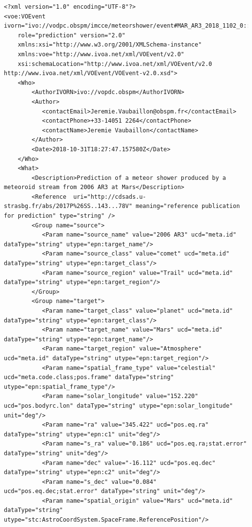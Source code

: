 \documentclass[referee,a4paper,12pt,traditabstract]{swsc}
\begin{document}
\begin{linenumbers}
{\tiny 
\begin{verbatim}
<?xml version="1.0" encoding="UTF-8"?>
<voe:VOEvent ivorn="ivo://vodpc.obspm/imcce/meteorshower/event#MAR_AR3_2018_1102_0::v1.0"
    role="prediction" version="2.0"
    xmlns:xsi="http://www.w3.org/2001/XMLSchema-instance"
    xmlns:voe="http://www.ivoa.net/xml/VOEvent/v2.0"
    xsi:schemaLocation="http://www.ivoa.net/xml/VOEvent/v2.0 http://www.ivoa.net/xml/VOEvent/VOEvent-v2.0.xsd">
    <Who>
        <AuthorIVORN>ivo://vopdc.obspm</AuthorIVORN>
        <Author>
           <contactEmail>Jeremie.Vaubaillon@obspm.fr</contactEmail>
           <contactPhone>+33-14051 2264</contactPhone>
           <contactName>Jeremie Vaubaillon</contactName> 
        </Author>
        <Date>2018-10-31T18:27:47.157580Z</Date>
    </Who>
    <What>
        <Description>Prediction of a meteor shower produced by a meteoroid stream from 2006 AR3 at Mars</Description>
        <Reference  uri="http://cdsads.u-strasbg.fr/abs/2017P%26SS..143...78V" meaning="reference publication for prediction" type="string" />
        <Group name="source">
           <Param name="source_name" value="2006 AR3" ucd="meta.id" dataType="string" utype="epn:target_name"/>
           <Param name="source_class" value="comet" ucd="meta.id" dataType="string" utype="epn:target_class"/>
           <Param name="source_region" value="Trail" ucd="meta.id" dataType="string" utype="epn:target_region"/>
        </Group>
        <Group name="target">
           <Param name="target_class" value="planet" ucd="meta.id" dataType="string" utype="epn:target_class"/>
           <Param name="target_name" value="Mars" ucd="meta.id" dataType="string" utype="epn:target_name"/>
           <Param name="target_region" value="Atmosphere" ucd="meta.id" dataType="string" utype="epn:target_region"/>
           <Param name="spatial_frame_type" value="celestial" ucd="meta.code.class;pos.frame" dataType="string" utype="epn:spatial_frame_type"/>
           <Param name="solar_longitude" value="152.220" ucd="pos.bodyrc.lon" dataType="string" utype="epn:solar_longitude" unit="deg"/>
           <Param name="ra" value="345.422" ucd="pos.eq.ra" dataType="string" utype="epn:c1" unit="deg"/>
           <Param name="s_ra" value="0.186" ucd="pos.eq.ra;stat.error" dataType="string" unit="deg"/>
           <Param name="dec" value="-16.112" ucd="pos.eq.dec" dataType="string" utype="epn:c2" unit="deg"/>
           <Param name="s_dec" value="0.084" ucd="pos.eq.dec;stat.error" dataType="string" unit="deg"/>
           <Param name="spatial_origin" value="Mars" ucd="meta.id" dataType="string" utype="stc:AstroCoordSystem.SpaceFrame.ReferencePosition"/>

\end{verbatim}}
\end{linenumbers}
\end{document}
